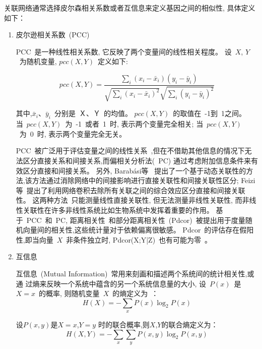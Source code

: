 关联网络通常选择皮尔森相关系数或者互信息来定义基因之间的相似性, 具体定义如下：
\begin{enumerate}
\item 
皮尔逊相关系数~(PCC)

PCC~是一种线性相关系数, 它反映了两个变量间的线性相关程度。
设~$X$, $Y$~为随机变量, $pcc(X,Y)$~定义如下:

\begin{equation}
pcc(X,Y) = \frac{{\sum\limits_i {(x_i -\bar x_i )(y_i -\bar y_i )} }}{{\sqrt {\sum\limits_i {(x_i  - \bar x_i )^2 } } \sqrt {\sum\limits_i {(y_i  - \bar y_i )^2 } } }}
\end{equation}

其中,$\bar x_i$、$\bar y_i$~分别是~Ｘ、Ｙ~的均值。
$pcc(X,Y)$~的取值在~-1到~1之间。
当~$pcc(X,Y)$~为~-1~或者~1~时, 表示两个变量完全相关;
当~$pcc(X,Y)$~为~0~时, 表示两个变量完全无关。

PCC~被广泛用于评估变量之间的线性关系~\cite{stuart2003gene},但在不借助其他信息的情况下无法区分直接关系和间接关系,而偏相关分析法(~PC) \cite{baba2004partial}通过考虑附加信息条件来有效区分直接和间接关系。
另外, Barabási等~\cite{barzel2013network} 提出了一个基于动态关联性的方法,该方法通过消除网络中的间接影响进行直接关联性和间接关联性区分; 
Feizi等~\cite{feizi2013network}提出了利用网络卷积去除所有关联之间的综合效应区分直接和间接关联性。
这两种方法~\cite{barzel2013network,feizi2013network}只能测量线性直接关联性,
但无法测量非线性关联性, 而非线性关联性在许多非线性系统比如生物系统中发挥着重要的作用。
基于~PCC~和~PC, 距离相关性~\cite{szekely2007measuring,kosorok2009brownian}和部分距离相关性~(Pdcor)~\cite{szekely2014partial}被提出用于度量随机向量间的相关性,这些统计量对于依赖偏离很敏感。
Pdcor~的评估存在假阳性,即当向量~$X$~非条件独立时, Pdcor(X;Y|Z)~也有可能为零~\cite{szekely2014partial}。

\item 
互信息

互信息~(Mutual Information)~常用来刻画和描述两个系统间的统计相关性,或通
过熵来反映一个系统中蕴含的另一个系统信息量的大小, 设~$P(x)$~是~$X=x$~的概率,
则随机变量~$X$~的熵定义为~\cite{cover2012elements}：
\begin{equation}
H(X) = - \sum\limits_x {P(x)\log _2 P(x)} 
\end{equation}

设$P(x,y)$是$X=x$,$Y=y$ 时的联合概率,则$X$,$Y$的联合熵定义为：
\begin{equation}
H(X,Y) =  - \sum\limits_x {\sum\limits_y {P(x,y)\log _2 P(x,y)} } 
\end{equation}


\end{enumerate}
